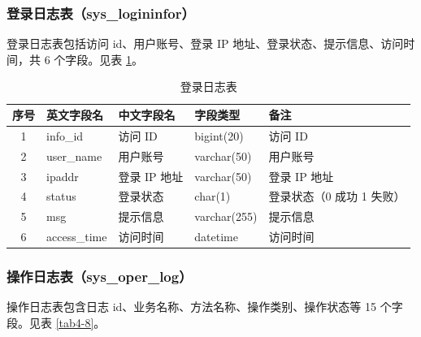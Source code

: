 \documentclass{izdthesis}
\begin{document}
\subsubsection{登录日志表（sys\_logininfor）}
登录日志表包括访问 id、用户账号、登录 IP 地址、登录状态、提示信息、访问时间，共 6 个字段。见表 \ref{tab4-7}。

\begin{table}[H]
  \centering
  \caption{登录日志表}
  \label{tab4-7}
  \songti
  \begin{tabular}{c l l l p{4cm}}
    \toprule
    序号 & 英文字段名 & 中文字段名 & 字段类型 & 备注 \\
    \midrule
    1 & info\_id & 访问 ID & bigint(20) & 访问 ID \\
    2 & user\_name & 用户账号 & varchar(50) & 用户账号 \\
    3 & ipaddr & 登录 IP 地址 & varchar(50) & 登录 IP 地址 \\
    4 & status & 登录状态 & char(1) & 登录状态（0 成功 1 失败） \\
    5 & msg & 提示信息 & varchar(255) & 提示信息 \\
    6 & access\_time & 访问时间 & datetime & 访问时间 \\
    \bottomrule
  \end{tabular}
\end{table}

\subsubsection{操作日志表（sys\_oper\_log）}
操作日志表包含日志 id、业务名称、方法名称、操作类别、操作状态等 15 个字段。见表 \ref{tab4-8}。
\end{document}
